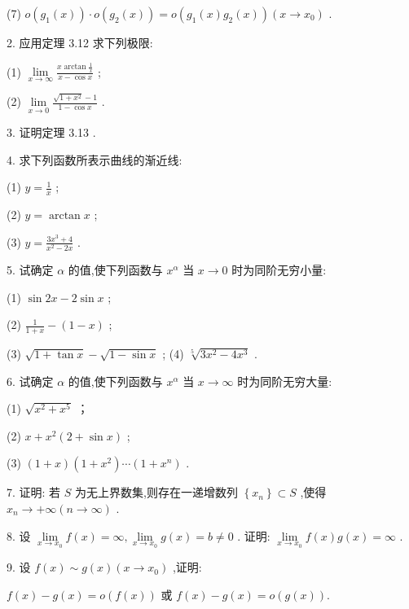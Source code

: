 (7) \(o\left( {{g}_{1}\left( x\right) }\right)  \cdot  o\left( {{g}_{2}\left( x\right) }\right)  = o\left( {{g}_{1}\left( x\right) {g}_{2}\left( x\right) }\right) \left( {x \rightarrow  {x}_{0}}\right)\) .

2. 应用定理 3.12 求下列极限:

(1) \(\mathop{\lim }\limits_{{x \rightarrow  \infty }}\frac{x\arctan \frac{1}{x}}{x - \cos x}\) ;

(2) \(\mathop{\lim }\limits_{{x \rightarrow  0}}\frac{\sqrt{1 + {x}^{2}} - 1}{1 - \cos x}\) .

3. 证明定理 3.13 .

4. 求下列函数所表示曲线的渐近线:

(1) \(y = \frac{1}{x}\) ;

(2) \(y = \arctan x\) ;

(3) \(y = \frac{3{x}^{3} + 4}{{x}^{2} - {2x}}\) .

5. 试确定 \(\alpha\) 的值,使下列函数与 \({x}^{\alpha }\) 当 \(x \rightarrow  0\) 时为同阶无穷小量:

(1) \(\sin {2x} - 2\sin x\) ;

(2) \(\frac{1}{1 + x} - \left( {1 - x}\right)\) ;

(3) \(\sqrt{1 + \tan x} - \sqrt{1 - \sin x}\) ; (4) \(\sqrt[5]{3{x}^{2} - 4{x}^{3}}\) .

6. 试确定 \(\alpha\) 的值,使下列函数与 \({x}^{\alpha }\) 当 \(x \rightarrow  \infty\) 时为同阶无穷大量:

(1) \(\sqrt{{x}^{2} + {x}^{5}}\) ；

(2) \(x + {x}^{2}\left( {2 + \sin x}\right)\) ;

(3) \(\left( {1 + x}\right) \left( {1 + {x}^{2}}\right) \cdots \left( {1 + {x}^{n}}\right)\) .

7. 证明: 若 \(S\) 为无上界数集,则存在一递增数列 \(\left\{  {x}_{n}\right\}   \subset  S\) ,使得 \({x}_{n} \rightarrow   + \infty \left( {n \rightarrow  \infty }\right)\) .

8. 设 \(\mathop{\lim }\limits_{{x \rightarrow  {x}_{0}}}f\left( x\right)  = \infty ,\mathop{\lim }\limits_{{x \rightarrow  {x}_{0}}}g\left( x\right)  = b \neq  0\) . 证明: \(\mathop{\lim }\limits_{{x \rightarrow  {x}_{0}}}f\left( x\right) g\left( x\right)  = \infty\) .

9. 设 \(f\left( x\right)  \sim  g\left( x\right) \left( {x \rightarrow  {x}_{0}}\right)\) ,证明:

\(f\left( x\right)  - g\left( x\right)  = o\left( {f\left( x\right) }\right)\) 或 \(f\left( x\right)  - g\left( x\right)  = o\left( {g\left( x\right) }\right) .\)

